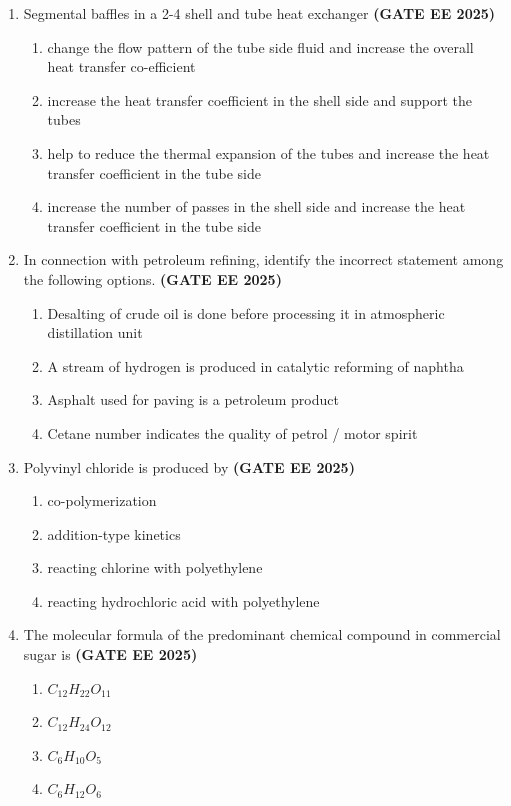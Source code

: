 \documentclass[journal,12pt,onecolumn]{IEEEtran}
\theoremstyle{remark}
\begin{document}
\begin{enumerate}
\item Segmental baffles in a 2-4 shell and tube heat exchanger
\hfill \textbf{(GATE EE 2025)} \begin{enumerate}
    \item change the flow pattern of the tube side fluid and increase the overall heat transfer co-efficient
    \item increase the heat transfer coefficient in the shell side and support the tubes
    \item help to reduce the thermal expansion of the tubes and increase the heat transfer coefficient in the tube side
    \item increase the number of passes in the shell side and increase the heat transfer coefficient in the tube side
\end{enumerate}


\item  In connection with petroleum refining, identify the incorrect statement among the following options.
\hfill \textbf{(GATE EE 2025)} \begin{enumerate}
    \item Desalting of crude oil is done before processing it in atmospheric distillation unit
    \item A stream of hydrogen is produced in catalytic reforming of naphtha
    \item Asphalt used for paving is a petroleum product
    \item Cetane number indicates the quality of petrol / motor spirit
\end{enumerate}


\item Polyvinyl chloride is produced by
\hfill \textbf{(GATE EE 2025)} \begin{enumerate}
    \item co-polymerization
    \item addition-type kinetics
    \item reacting chlorine with polyethylene
    \item reacting hydrochloric acid with polyethylene
\end{enumerate}
\hfill
\textbf{}

\item The molecular formula of the predominant chemical compound in commercial sugar is
\hfill \textbf{(GATE EE 2025)} \begin{enumerate}
    \item $C_{12}H_{22}O_{11}$
    \item $C_{12}H_{24}O_{12}$
    \item $C_{6}H_{10}O_{5}$
    \item $C_{6}H_{12}O_{6}$
\end{enumerate}



\end{enumerate}
\end{document}
